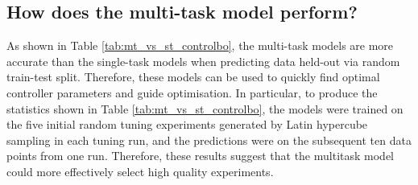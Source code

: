 

\subsection{How does the multi-task model perform?}

As shown in Table \ref{tab:mt_vs_st_controlbo}, the multi-task models are more accurate than the single-task models when predicting data held-out via random train-test split. Therefore, these models can be used to quickly find optimal controller parameters and guide optimisation. In particular, to produce the statistics shown in Table \ref{tab:mt_vs_st_controlbo}, the models were trained on the five initial random tuning experiments generated by Latin hypercube sampling in each tuning run, and the predictions were on the subsequent ten data points from one run. Therefore, these results suggest that the multitask model could more effectively select high quality experiments.

